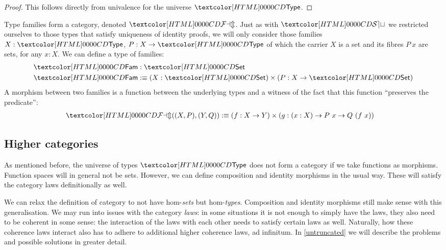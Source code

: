 \begin{proof}
  This follows directly from univalence for the universe $\Type$.
\end{proof}

\begin{example}
  Type families form a category, denoted $\FAM$. Just as with $\SET$
  we restricted ourselves to those types that satisfy uniqueness of
  identity proofs, we will only consider those families $X : \Type$,
  $P : X \to \Type$ of which the carrier $X$ is a set and its fibres
  $P\ x$ are sets, for any $x : X$. We can define a type of families:
  \begin{align*}
    &\Fam : \Set \\
    &\Fam \ddefeq (X : \Set) \times (P : X \to \Set)
  \end{align*}
  A morphism between two families is a function between the underlying
  types and a witness of the fact that this function ``preserves the
  predicate'':
  \begin{align*}
    &\FAM((X,P),(Y,Q)) \ddefeq (f : X \to Y) \times (g : (x : X) \to P\ x \to Q\ (f\ x))
  \end{align*}
\end{example}

\subsection{Higher categories}
\label{higher-cats}

As mentioned before, the universe of types $\Type$ does not form a
category if we take functions as morphisms. Function spaces will in
general not be sets. However, we can define composition and identity
morphisms in the usual way. These will satisfy the category laws
definitionally as well.

We can relax the definition of category to not have hom-\emph{sets}
but hom-\emph{types}. Composition and identity morphisms still make
sense with this generalisation. We may run into issues with the
category \emph{laws}: in some situations it is not enough to simply
have the laws, they also need to be coherent in some sense: the
interaction of the laws with each other needs to satisfy certain laws
as well. Naturally, how these coherence laws interact also has to
adhere to additional higher coherence laws, ad infinitum. In
\cref{untruncated} we will describe the problems and possible
solutions in greater detail.
